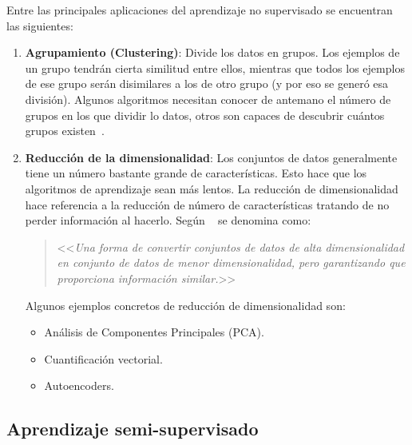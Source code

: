 Entre las principales aplicaciones del aprendizaje no supervisado se encuentran las siguientes:
\vspace{-4px}
\begin{enumerate}
    \item \textbf{Agrupamiento (Clustering)}: Divide los datos en grupos. Los ejemplos de un grupo tendrán cierta similitud entre ellos, mientras que todos los ejemplos de ese grupo serán disimilares a los de otro grupo (y por eso se generó esa división). Algunos algoritmos necesitan conocer de antemano el número de grupos en los que dividir lo datos, otros son capaces de descubrir cuántos grupos existen~\cite{salim:usl}.
    \item \textbf{Reducción de la dimensionalidad}: Los conjuntos de datos generalmente tiene un número bastante grande de características. Esto hace que los algoritmos de aprendizaje sean más lentos. La reducción de dimensionalidad hace referencia a la reducción de número de características tratando de no perder información al hacerlo.
    Según
   ~\cite{javatpoint:reduccionsdims} se denomina
    como: \begin{quote}<<\textit{Una forma de convertir conjuntos de datos de alta dimensionalidad en
    conjunto de datos de menor dimensionalidad, pero garantizando que proporciona
    información similar.}>>\end{quote} 
    
    Algunos ejemplos concretos de reducción de dimensionalidad son:
    \begin{itemize}
        \item Análisis de Componentes Principales (PCA).
        \item Cuantificación vectorial.
        \item Autoencoders.
    \end{itemize}
\end{enumerate}


\subsection{Aprendizaje semi-supervisado}
\label{aprendizaje-semi-supervisado}

